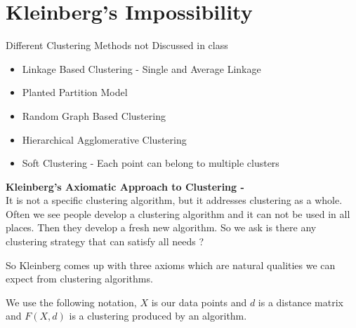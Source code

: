 \section{Kleinberg's Impossibility}
  Different Clustering Methods not Discussed in class
 
\begin{itemize}
  \item Linkage Based Clustering - Single and Average Linkage \cite{ackerman}
  \item Planted Partition Model \cite{chaudhuri}
  \item Random Graph Based Clustering
  \item Hierarchical Agglomerative Clustering \cite{aglclus}
  \item Soft Clustering - Each point can belong to multiple clusters \cite{bilmes}
\end{itemize}

\textbf{Kleinberg's Axiomatic Approach to Clustering -} \cite{klnbrgimp} \\
It is not a specific clustering algorithm, but it addresses clustering as a whole. Often we see people develop a clustering algorithm and it can not be used in all places. Then they develop a fresh new algorithm. So we ask is there any clustering strategy that can satisfy all needs ?

So Kleinberg comes up with three axioms which are natural qualities we can expect from clustering algorithms.

We use the following notation, $X$ is our data points and $d$ is a distance matrix and $F(X,d)$ is a clustering produced by an algorithm.\\\\

